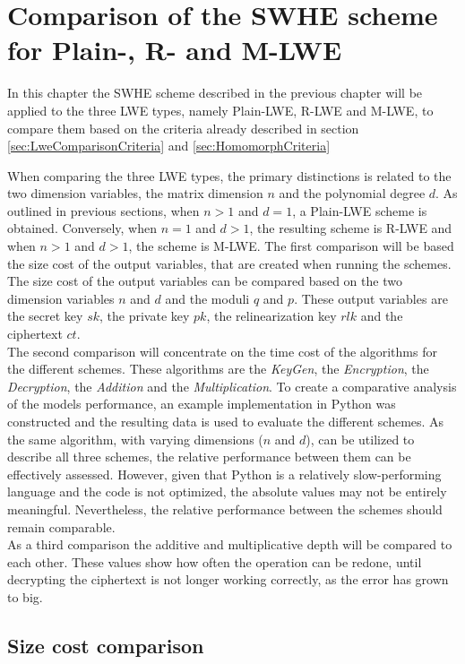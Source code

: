 \chapter{Comparison of the SWHE scheme for Plain-, R- and M-LWE}

In this chapter the SWHE scheme described in the previous chapter will be applied to the three LWE types, namely Plain-LWE, R-LWE and M-LWE, to compare them based on the criteria already described in section \ref{sec:LweComparisonCriteria} and \ref{sec:HomomorphCriteria}

When comparing the three LWE types, the primary distinctions is related to the two dimension variables, the matrix dimension $n$ and the polynomial degree $d$. As outlined in previous sections, when $n>1$ and $d=1$, a Plain-LWE scheme is obtained. Conversely, when $n=1$ and $d>1$, the resulting scheme is R-LWE and when $n>1$ and $d>1$, the scheme is M-LWE. The first comparison will be based the size cost of the output variables, that are created when running the schemes. The size cost of the output variables can be compared based on the two dimension variables $n$ and $d$ and the moduli $q$ and $p$. These output variables are the secret key $sk$, the private key $pk$, the relinearization key $rlk$ and the ciphertext $ct$. \\
The second comparison will concentrate on the time cost of the algorithms for the different schemes. These algorithms are the \textit{KeyGen}, the \textit{Encryption}, the \textit{Decryption}, the \textit{Addition} and the \textit{Multiplication}. To create a comparative analysis of the models performance, an example implementation in Python was constructed and the resulting data is used to evaluate the different schemes. As the same algorithm, with varying dimensions ($n$ and $d$), can be utilized to describe all three schemes, the relative performance between them can be effectively assessed. However, given that Python is a relatively slow-performing language and the code is not optimized, the absolute values may not be entirely meaningful. Nevertheless, the relative performance between the schemes should remain comparable.\\
As a third comparison the additive and multiplicative depth will be compared to each other. These values show how often the operation can be redone, until decrypting the ciphertext is not longer working correctly, as the error has grown to big.

\section{Size cost comparison}
\label{sec:sizeCostComparison}

